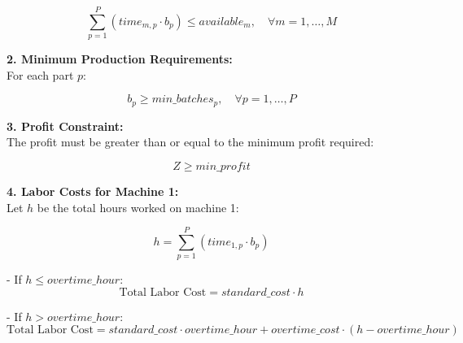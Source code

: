 \documentclass{article}
\begin{document}
\[
\sum_{p=1}^{P} (time_{m,p} \cdot b_{p}) \leq available_{m}, \quad \forall m = 1, \dots, M
\]

\textbf{2. Minimum Production Requirements:} \\
For each part \( p \):

\[
b_{p} \geq min\_batches_{p}, \quad \forall p = 1, \dots, P
\]

\textbf{3. Profit Constraint:} \\
The profit must be greater than or equal to the minimum profit required:

\[
Z \geq min\_profit
\]

\textbf{4. Labor Costs for Machine 1:} \\
Let \( h \) be the total hours worked on machine 1:

\[
h = \sum_{p=1}^{P} (time_{1,p} \cdot b_{p})
\]

- If \( h \leq overtime\_hour \):
\[
\text{Total Labor Cost} = standard\_cost \cdot h
\]

- If \( h > overtime\_hour \):
\[
\text{Total Labor Cost} = standard\_cost \cdot overtime\_hour + overtime\_cost \cdot (h - overtime\_hour)
\]
\end{document}
